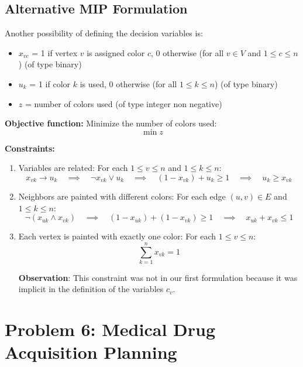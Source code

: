 \documentclass[a4paper,10pt]{article}
\begin{document}
\subsection*{Alternative MIP Formulation}

Another possibility of defining the decision variables is:
\begin{itemize}
  \item \(x_{vc}\) = 1 if vertex \(v\) is assigned color \(c\), 0 otherwise (for all \(v \in V\) and \(1 \leq c \leq n\)) (of type binary)
  \item \(u_k\) = 1 if color \(k\) is used, 0 otherwise (for all \(1 \leq k \leq n\)) (of type binary)
  \item \(z\) = number of colors used (of type integer non negative) 
\end{itemize}

\textbf{Objective function:}
Minimize the number of colors used: 
\[
\min z
\]

\textbf{Constraints:}
\begin{enumerate}
  \item Variables are related:
  For each \(1 \leq v \leq n\) and \(1 \leq k \leq n\):
  \[x_{vk} \rightarrow u_k \quad \implies \quad \lnot x_{vk} \lor u_k \quad \implies \quad (1 - x_{vk}) + u_k \geq 1 \quad \implies \quad \boxed{u_k \geq x_{vk}}\]

  \item Neighbors are painted with different colors:
  For each edge \((u,v) \in E\) and \(1 \leq k \leq n\):
  \[
    \lnot (x_{uk} \land x_{vk}) \quad \implies \quad (1 - x_{uk}) + (1 - x_{vk}) \geq 1 \quad \implies \quad \boxed{x_{uk} + x_{vk} \leq 1}
  \]

  \item Each vertex is painted with exactly one color:
  For each \(1 \leq v \leq n\):
  \[\boxed{\sum_{k=1}^n x_{vk} = 1}\]

  \textbf{Observation}: This constraint was not in our first formulation because it was implicit in the definition of the variables \(c_v\).

\end{enumerate}

\newpage

\section*{Problem 6: Medical Drug Acquisition Planning}
\end{document}
